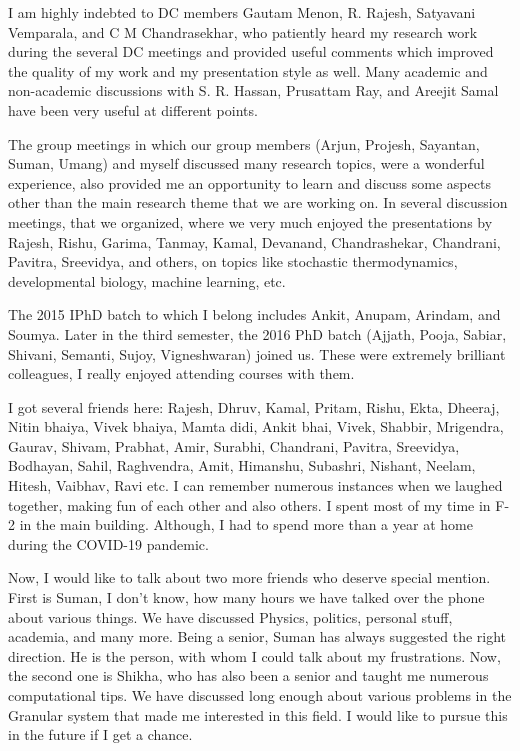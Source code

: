I am highly indebted to DC members Gautam Menon, R. Rajesh, Satyavani Vemparala, and C M Chandrasekhar, who patiently heard my research work during the several DC meetings and provided useful comments which improved the quality of my work and my presentation style as well. Many academic and non-academic discussions with S. R. Hassan, Prusattam Ray, and Areejit Samal have been very useful at different points.

The group meetings in which our group members (Arjun, Projesh, Sayantan, Suman, Umang) and myself discussed many research topics, were a wonderful experience, also provided me an opportunity to learn and discuss some aspects other than the main research theme that we are working on. In several discussion meetings, that we organized, where we very much enjoyed the presentations by Rajesh, Rishu, Garima, Tanmay, Kamal, Devanand, Chandrashekar, Chandrani, Pavitra, Sreevidya, and others, on topics like stochastic thermodynamics, developmental biology, machine learning, etc.

The 2015 IPhD batch to which I belong includes Ankit, Anupam, Arindam, and Soumya. Later in the third semester, the 2016 PhD batch (Ajjath, Pooja, Sabiar, Shivani, Semanti, Sujoy, Vigneshwaran) joined us. These were extremely brilliant colleagues, I really enjoyed attending courses with them. 

I got several friends here: Rajesh, Dhruv, Kamal, Pritam, Rishu, Ekta, Dheeraj, Nitin bhaiya, Vivek bhaiya, Mamta didi, Ankit bhai, Vivek, Shabbir, Mrigendra, Gaurav, Shivam, Prabhat, Amir, Surabhi, Chandrani, Pavitra, Sreevidya, Bodhayan, Sahil, Raghvendra, Amit, Himanshu, Subashri, Nishant, Neelam, Hitesh, Vaibhav, Ravi etc. I can remember numerous instances when we laughed together, making fun of each other and also others. I spent most of my time in F-2 in the main building. Although, I had to spend more than a year at home during the COVID-19 pandemic.

Now, I would like to talk about two more friends who deserve special mention. First is Suman, I don't know, how many hours we have talked over the phone about various things. We have discussed Physics, politics, personal stuff, academia, and many more. Being a senior, Suman has always suggested the right direction. He is the person, with whom I could talk about my frustrations. Now, the second one is Shikha, who has also been a senior and taught me numerous computational tips. We have discussed long enough about various problems in the Granular system that made me interested in this field. I would like to pursue this in the future if I get a chance.

